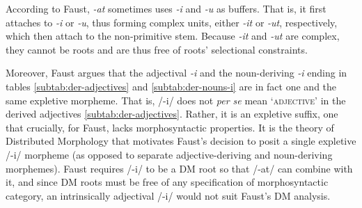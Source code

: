 According to Faust, \textit{-at} sometimes uses \textit{-i} and 
\textit{-u} as buffers. That is, it first attaches to \textit{-i} or \textit{-u}, 
thus forming complex units, either \emph{-it} or \emph{-ut}, respectively, 
which then attach to
the non-primitive stem. Because \emph{-it} and \emph{-ut} are complex, 
they cannot be roots and are thus free of roots' selectional constraints.

Moreover, Faust argues that the adjectival \textit{-i} and 
the noun-deriving \textit{-i} ending in tables 
\ref{subtab:der-adjectives} and \ref{subtab:der-nouns-i} 
are in fact one and the same expletive morpheme. That is, 
/-i/ does not \textit{per se} mean `\textsc{adjective}' in the derived adjectives 
\ref{subtab:der-adjectives}. Rather, it is an expletive suffix, one that 
crucially, for Faust, lacks morphosyntactic properties.
It is the theory of Distributed Morphology that motivates Faust's decision to posit a single 
expletive /-i/ morpheme (as opposed to 
separate adjective-deriving and noun-deriving morphemes).  Faust 
requires /-i/ to be a \ac{DM} root so that /-at/ can combine with it, and since 
\ac{DM} roots must be free of any specification of morphosyntactic 
category, an intrinsically adjectival /-i/ would
not suit Faust's \ac{DM} analysis. 

